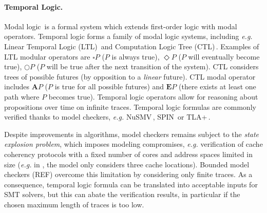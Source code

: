 
\paragraph{Temporal Logic.}
%
Modal logic\,\cite{chagrov1997modal} is a formal system which extends
first-order logic with modal operators.
%
Temporal logic forms a family of modal logic systems, including \emph{e.g.}
Linear Temporal Logic (LTL)\,\cite{sistla1985ltl} and Computation Logic Tree
(CTL)\,\cite{clarke1981ctl}.
%
Examples of LTL modular operators are \( \square P \) (\( P \) is always true),
\( \Diamond P \) (\( P \) will eventually become true), \( \bigcirc P \)
(\( P \) will be true after the next transition of the system).
%
CTL considers trees of possible futures (by opposition to a \emph{linear}
future).
%
CTL modal operator includes \( \mathbf{A} P \) (\( P \) is true for all possible
futures) and \( \mathbf{E} P \) (there exists at least one path where \( P \)
becomes true).
%
Temporal logic operators allow for reasoning about propositions over time on
infinite traces.
%
Temporal logic formulas are commonly verified thanks to model checkers,
\emph{e.g.}  NuSMV\,\cite{cimatti2002nusmv}, SPIN\,\cite{holzmann1997spin} or
TLA+\,\cite{lamport2002tla}.

Despite improvements in algorithms, model checkers remains subject to the
\emph{state explosion problem}, which imposes modeling compromises, \emph{e.g.}
verification of cache coherency protocols with a fixed number of cores and
address spaces limited in size (\emph{e.g.} in \cite{lie2003xom}, the model only
considers three cache locations).
%
%
Bounded model checkers (REF) overcome this limitation by considering only finite
traces.
%
As a consequence, temporal logic formula can be translated into acceptable
inputs for SMT solvers, but this can abate the verification results, in
particular if the chosen maximum length of traces is too low.

